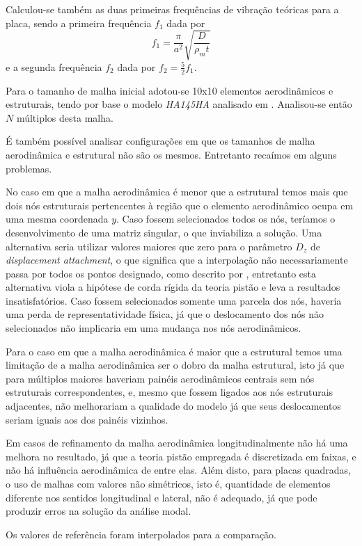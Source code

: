 Calculou-se também as duas primeiras frequências de vibração teóricas
para a placa, sendo a primeira frequência $f_1$ dada por
$$f_1 = \frac{\pi}{a^2}\sqrt{\frac{D}{\rho_m t}}$$
e a segunda frequência $f_2$ dada por
$f_2 = \frac{5}{2}f_1$.

Para o tamanho de malha inicial adotou-se 10x10 elementos aerodinâmicos e estruturais, tendo por base o modelo \emph{HA145HA} analisado em \cite{rodden_mscnastran_1994}. Analisou-se então $N$ múltiplos desta malha.

É também possível analisar configurações em que os tamanhos de malha aerodinâmica e estrutural não são os mesmos. Entretanto recaímos em alguns problemas.

No caso em que a malha aerodinâmica é menor que a estrutural temos 
mais que dois nós estruturais pertencentes à região que o elemento 
aerodinâmico ocupa em uma mesma coordenada $y$. Caso fossem 
selecionados todos os nós, teríamos o desenvolvimento de uma
matriz singular, o que inviabiliza a solução. Uma alternativa seria 
utilizar valores maiores que zero para o parâmetro $D_z$ de 
\emph{displacement attachment}, o que significa que a interpolação não
necessariamente passa por todos os pontos designado, como descrito por \cite{rodden_mscnastran_1994}, entretanto esta 
alternativa viola a hipótese de corda rígida da teoria pistão e leva a
resultados insatisfatórios. Caso fossem selecionados somente uma 
parcela dos nós, haveria uma perda de representatividade física, já 
que o deslocamento dos nós não selecionados não implicaria em uma 
mudança nos nós aerodinâmicos.

Para o caso em que a malha aerodinâmica é maior que a estrutural temos
uma limitação de a malha aerodinâmica ser o dobro da malha estrutural,
isto já que para múltiplos maiores haveriam painéis aerodinâmicos 
centrais sem nós estruturais correspondentes, e, mesmo que fossem 
ligados aos nós estruturais adjacentes, não melhorariam a qualidade do
modelo já que seus deslocamentos seriam iguais aos dos painéis vizinhos.

Em casos de refinamento da malha aerodinâmica longitudinalmente não há uma melhora no resultado, já que a teoria pistão empregada é discretizada em faixas, e não há influência aerodinâmica de entre elas. Além disto, para placas quadradas, o uso de malhas com valores não simétricos, isto é, quantidade de elementos diferente nos sentidos longitudinal e lateral, não é adequado, já que pode produzir erros na solução da análise modal.

Os valores de referência foram interpolados para a comparação.

